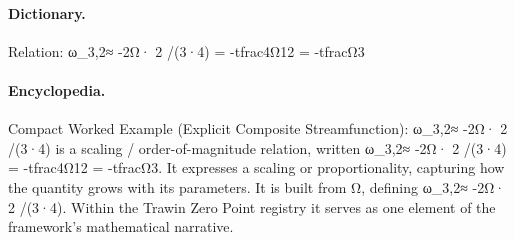 \paragraph{Dictionary.}
Relation: ω\_3,2≈ -2Ω· 2 /(3·4) = -tfrac4Ω12 = -tfracΩ3

\paragraph{Encyclopedia.}
Compact Worked Example (Explicit Composite Streamfunction): ω\_3,2≈ -2Ω· 2 /(3·4) is a scaling / order-of-magnitude relation, written ω\_3,2≈ -2Ω· 2 /(3·4) = -tfrac4Ω12 = -tfracΩ3. It expresses a scaling or proportionality, capturing how the quantity grows with its parameters. It is built from Ω, defining ω\_3,2≈ -2Ω· 2 /(3·4). Within the Trawin Zero Point registry it serves as one element of the framework's mathematical narrative.
